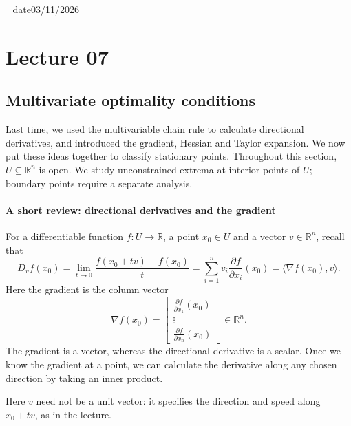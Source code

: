 \lecture_date{03/11/2026}
\chapter{Lecture 07}

\section{Multivariate optimality conditions}
\label{sec:lec07-optimality}
Last time, we used the multivariable chain rule to calculate directional derivatives, and introduced the gradient, Hessian and Taylor expansion. We now put these ideas together to classify stationary points. Throughout this section, $U\subseteq\mathbb{R}^n$ is open. We study unconstrained extrema at interior points of $U$; boundary points require a separate analysis.

\subsubsection*{A short review: directional derivatives and the gradient}
For a differentiable function $f:U\to\mathbb{R}$, a point $x_0\in U$ and a vector $v\in\mathbb{R}^n$, recall that
\begin{equation}
 D_vf(x_0)=\lim_{t\to0}\frac{f(x_0+tv)-f(x_0)}{t}
 =\sum_{i=1}^n v_i\frac{\partial f}{\partial x_i}(x_0)
 =\langle\nabla f(x_0),v\rangle.
 \label{eq:lec07-directional}
\end{equation}
Here the gradient is the column vector
\[
 \nabla f(x_0)=\begin{bmatrix}
 \frac{\partial f}{\partial x_1}(x_0)\\ \vdots\\
 \frac{\partial f}{\partial x_n}(x_0)
 \end{bmatrix}\in\mathbb{R}^n.
\]
The gradient is a vector, whereas the directional derivative is a scalar. Once we know the gradient at a point, we can calculate the derivative along any chosen direction by taking an inner product.

Here $v$ need not be a unit vector: it specifies the direction and speed along $x_0+tv$, as in the lecture.

